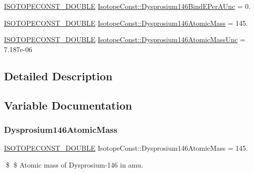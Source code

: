 \begin{DoxyCompactItemize}
\item 
\mbox{\hyperlink{group___isotope_const-_macros_ga8f45a7272ce02c0b4c65c44636ed719a}{I\+S\+O\+T\+O\+P\+E\+C\+O\+N\+S\+T\+\_\+\+D\+O\+U\+B\+LE}} \mbox{\hyperlink{group___isotope_const-_dysprosium-_dy146_ga0be79cb0f218c5602711cd6a1c447b6f}{Isotope\+Const\+::\+Dysprosium146\+Bind\+E\+Per\+A\+Unc}} = 0.
\item 
\mbox{\hyperlink{group___isotope_const-_macros_ga8f45a7272ce02c0b4c65c44636ed719a}{I\+S\+O\+T\+O\+P\+E\+C\+O\+N\+S\+T\+\_\+\+D\+O\+U\+B\+LE}} \mbox{\hyperlink{group___isotope_const-_dysprosium-_dy146_ga4fe00c513950210d984e54b8c9a00681}{Isotope\+Const\+::\+Dysprosium146\+Atomic\+Mass}} = 145.
\item 
\mbox{\hyperlink{group___isotope_const-_macros_ga8f45a7272ce02c0b4c65c44636ed719a}{I\+S\+O\+T\+O\+P\+E\+C\+O\+N\+S\+T\+\_\+\+D\+O\+U\+B\+LE}} \mbox{\hyperlink{group___isotope_const-_dysprosium-_dy146_ga9c028ec750cf4aaf339e3197684483f7}{Isotope\+Const\+::\+Dysprosium146\+Atomic\+Mass\+Unc}} = 7.\+187e-\/06
\end{DoxyCompactItemize}


\subsection{Detailed Description}


\subsection{Variable Documentation}
\mbox{\label{group___isotope_const-_dysprosium-_dy146_ga4fe00c513950210d984e54b8c9a00681}} 
\subsubsection{\texorpdfstring{Dysprosium146\+Atomic\+Mass}{Dysprosium146AtomicMass}}
{\footnotesize\ttfamily \mbox{\hyperlink{group___isotope_const-_macros_ga8f45a7272ce02c0b4c65c44636ed719a}{I\+S\+O\+T\+O\+P\+E\+C\+O\+N\+S\+T\+\_\+\+D\+O\+U\+B\+LE}} Isotope\+Const\+::\+Dysprosium146\+Atomic\+Mass = 145.}

\$ \$ Atomic mass of Dysprosium-\/146 in amu. \mbox{\label{group___isotope_const-_dysprosium-_dy146_ga9c028ec750cf4aaf339e3197684483f7}} 
